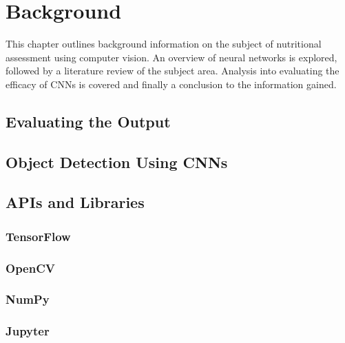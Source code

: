 \chapter{Background}
\label{background}

This chapter outlines background information on the subject of nutritional assessment using computer vision.
An overview of neural networks is explored, followed by a literature review of the subject area.
Analysis into evaluating the efficacy of CNNs is covered and finally a conclusion to the information gained.











\section{Evaluating the Output}




\section{Object Detection Using CNNs}


\section{APIs and Libraries}
\subsection*{TensorFlow}


\subsection*{OpenCV}


\subsection*{NumPy}


\subsection*{Jupyter}


